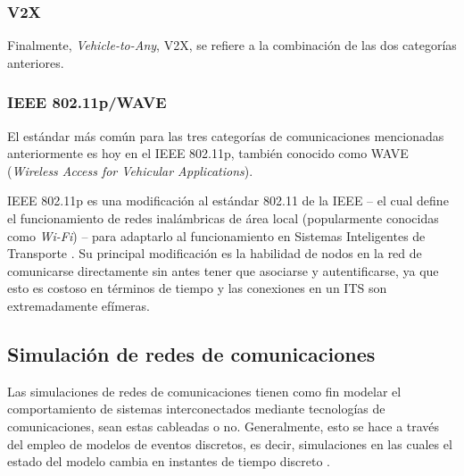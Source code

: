 \subsubsection{V2X}

Finalmente, \emph{Vehicle-to-Any}, V2X, se refiere a la combinación de las dos categorías anteriores.

\subsubsection{IEEE 802.11p/WAVE}\label{sec:its_comms:wave}

El estándar más común para las tres categorías de comunicaciones mencionadas anteriormente es hoy en el IEEE 802.11p, también conocido como WAVE (\emph{Wireless Access for Vehicular Applications}).

IEEE 802.11p es una modificación al estándar 802.11 de la IEEE -- el cual define el funcionamiento de redes inalámbricas de área local (popularmente conocidas como \emph{Wi-Fi}) -- para adaptarlo al funcionamiento en Sistemas Inteligentes de Transporte \autocite{80211wave}. Su principal modificación es la habilidad de nodos en la red de comunicarse directamente sin antes tener que asociarse y autentificarse, ya que esto es costoso en términos de tiempo y las conexiones en un ITS son extremadamente efímeras.


%

\subsection{Simulación de redes de comunicaciones}

Las simulaciones de redes de comunicaciones tienen como fin modelar el comportamiento de sistemas interconectados mediante tecnologías de comunicaciones, sean estas cableadas o no. Generalmente, esto se hace a través del empleo de modelos de eventos discretos, es decir, simulaciones en las cuales el estado del modelo cambia en instantes de tiempo discreto \autocite{SchriberDiscreteSim}.

